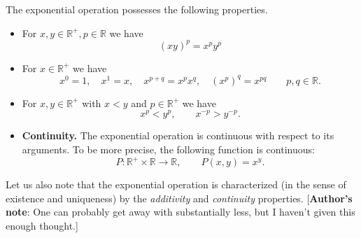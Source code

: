 \documentclass[12pt]{article}
\newcommand{\reals}{\mathbb{R}}
\begin{document}
The exponential operation possesses the following properties.  
\begin{itemize}
\item {} For $x,y\in\reals^+, p\in \reals$ we have
$$(xy)^p = x^p y^p$$
\item {} For $x\in\reals^+$ we have
$$x^0=1,\quad x^1 = x,\quad x^{p+q} = x^p x^q,\quad (x^p)^q=x^{pq}\qquad p,q\in\reals.$$
\item {}  For $x,y\in\reals^+$ with $x<y$
  and $p\in \reals^+$ we have
  $$x^p < y^p,\qquad x^{-p} > y^{-p}.$$
\item {\bf Continuity.}
The exponential operation is continuous with respect to its
arguments. To be more precise, the following function is continuous:
$$P:\reals^+\times\reals\rightarrow \reals,\qquad P(x,y)=x^y.$$
\end{itemize}
Let us also note that the exponential operation is characterized (in
the sense of existence and uniqueness) by the {\em additivity} and
{\em continuity} properties.  [{\bf Author's note}: One can probably get away with
substantially less, but I haven't given this enough thought.]
\end{document}
